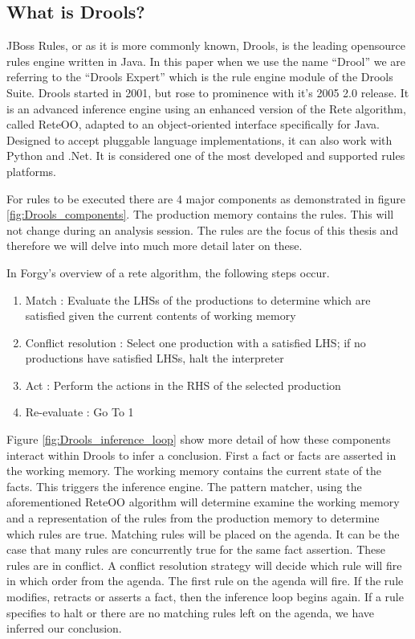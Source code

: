 \subsection{What is Drools?}\label{section:WhatIsDrools}

JBoss Rules, or as it is more commonly known, Drools, is the leading opensource rules engine written in Java.
In this paper when we use the name ``Drool'' we are referring to the ``Drools Expert'' which is the rule engine module of the Drools Suite.
Drools started in 2001, but rose to prominence with it's 2005 2.0 release.
It is an advanced inference engine using an enhanced version of the Rete algorithm, called Rete\-OO\cite{sottara2010configurable}, adapted to an object-oriented interface specifically for Java.
Designed to accept pluggable language implementations, it can also work with Python and .Net.
It is considered one of the most developed and supported rules platforms.

For rules to be executed there are 4 major components as demonstrated in figure \ref{fig:Drools_components}.
The production memory contains the rules.
This will not change during an analysis session.
The rules are the focus of this thesis and therefore we will delve into much more detail later on these.

In Forgy's\cite{forgy1989rete} overview of a rete algorithm, the following steps occur.
\begin{enumerate}
    \item Match : Evaluate the LHSs of the productions to determine which are satisfied given the current contents of working memory
    \item Conflict resolution : Select one production with a satisfied LHS; if no productions have satisfied LHSs, halt the interpreter
    \item Act : Perform the actions in the RHS of the selected production
    \item Re-evaluate : Go To 1
\end{enumerate}

Figure \ref{fig:Drools_inference_loop} show more detail of how these components interact within Drools to infer a conclusion.
First a fact or facts are asserted in the working memory.
The working memory contains the current state of the facts.
This triggers the inference engine.
The pattern matcher, using the aforementioned Rete\-OO algorithm will determine examine the working memory and a representation of the rules from the production memory to determine which rules are true.
Matching rules will be placed on the agenda.
It can be the case that many rules are concurrently true for the same fact assertion.
These rules are in conflict.
A conflict resolution strategy will decide which rule will fire in which order from the agenda.
The first rule on the agenda will fire.
If the rule modifies, retracts or asserts a fact, then the inference loop begins again.
If a rule specifies to halt or there are no matching rules left on the agenda, we have inferred our conclusion.


